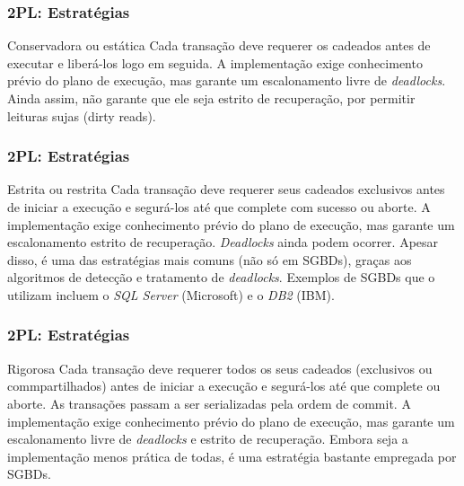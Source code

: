 \documentclass{beamer}
\begin{document}
\begin{frame}
    \frametitle{2PL: Estratégias}
    
    \begin{block}{Conservadora ou estática}
        Cada transação deve requerer os cadeados antes de executar e liberá-los logo em seguida. A implementação exige conhecimento prévio do plano de execução, mas garante um escalonamento livre de \emph{deadlocks}. Ainda assim, não garante que ele seja estrito de recuperação, por permitir leituras sujas (dirty reads).
    \end{block}
\end{frame}


\begin{frame}
    \frametitle{2PL: Estratégias}
    \begin{block}{Estrita ou restrita}
        Cada transação deve requerer seus cadeados exclusivos antes de iniciar a execução e segurá-los até que complete com sucesso ou aborte. A implementação exige conhecimento prévio do plano de execução, mas garante um escalonamento estrito de recuperação. \emph{Deadlocks} ainda podem ocorrer. Apesar disso, é uma das estratégias mais comuns (não só em SGBDs), graças aos algoritmos de detecção e tratamento de \emph{deadlocks}. Exemplos de SGBDs que o utilizam incluem o \emph{SQL Server} (Microsoft) e o \emph{DB2} (IBM).
    \end{block}
\end{frame}

\begin{frame}
    \frametitle{2PL: Estratégias}
    \begin{block}{Rigorosa}
        Cada transação deve requerer todos os seus cadeados (exclusivos ou commpartilhados) antes de iniciar a execução e segurá-los até que complete ou aborte. As transações passam a ser serializadas pela ordem de commit. A implementação exige conhecimento prévio do plano de execução, mas garante um escalonamento livre de \emph{deadlocks} e estrito de recuperação. Embora seja a implementação menos prática de todas, é uma estratégia bastante empregada por SGBDs.
    \end{block}
\end{frame}

\end{document}
